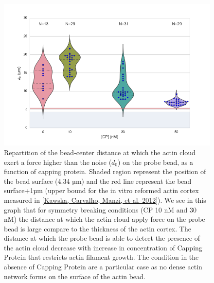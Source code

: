 \documentclass[A4paperpaper,11pt,english]{sphinxmanual}
\begin{document}
\begin{figure}[htbp]
\centering
\capstart

\includegraphics[width=0.800\linewidth]{d0_violin.png}
\caption{Repartition of the bead-center distance at which the actin cloud exert a
force higher than the noise (\(d_0\)) on the probe bead, as a function of
capping protein. Shaded region represent the position of the bead surface (4.34 µm)
and the red line represent the bead surface+1µm (upper bound for the in vitro
reformed actin cortex measured in {\hyperref[parts/part3:kawska2012]{{[}Kawska, Carvalho, Manzi,  et al.  2012{]}}}). We see in this graph that for symmetry breaking
conditions (CP 10 nM and 30 nM) the distance at which the actin cloud apply
force on the probe bead is large compare to the thickness of the actin
cortex. The distance at which the probe bead is able to detect the presence
of the actin cloud decrease with increase in concentration of Capping
Protein that restricts  actin filament growth. The condition in the absence
of Capping Protein are a particular case as no dense actin network forms
on the surface of the actin bead.}\label{parts/part3:d0-violin}\end{figure}
\end{document}
